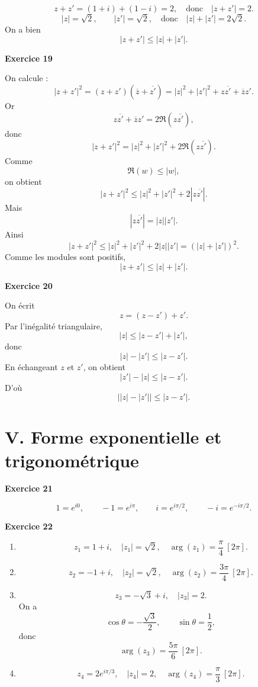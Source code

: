 \documentclass[11pt,a4paper]{article}
\begin{document}
\[
z+z'=(1+i)+(1-i)=2,
\quad \text{donc} \quad |z+z'|=2.
\]
\[
|z|=\sqrt2,\qquad |z'|=\sqrt2,
\quad \text{donc} \quad |z|+|z'|=2\sqrt2.
\]
On a bien
\[
|z+z'|\le |z|+|z'|.
\]

\textbf{Exercice 19}

On calcule :
\[
|z+z'|^2=(z+z')(\overline z+\overline{z'})
=|z|^2+|z'|^2+z\overline{z'}+\overline z z'.
\]
Or
\[
z\overline{z'}+\overline z z'=2\Re(z\overline{z'}),
\]
donc
\[
|z+z'|^2=|z|^2+|z'|^2+2\Re(z\overline{z'}).
\]
Comme
\[
\Re(w)\le |w|,
\]
on obtient
\[
|z+z'|^2\le |z|^2+|z'|^2+2|z\overline{z'}|.
\]
Mais
\[
|z\overline{z'}|=|z||z'|.
\]
Ainsi
\[
|z+z'|^2\le |z|^2+|z'|^2+2|z||z'|=(|z|+|z'|)^2.
\]
Comme les modules sont positifs,
\[
|z+z'|\le |z|+|z'|.
\]

\textbf{Exercice 20}

On écrit
\[
z=(z-z')+z'.
\]
Par l’inégalité triangulaire,
\[
|z|\le |z-z'|+|z'|,
\]
donc
\[
|z|-|z'|\le |z-z'|.
\]
En échangeant \(z\) et \(z'\), on obtient
\[
|z'|-|z|\le |z-z'|.
\]
D’où
\[
\big||z|-|z'|\big|\le |z-z'|.
\]

\section*{V. Forme exponentielle et trigonométrique}

\textbf{Exercice 21}

\[
1=e^{i0},
\qquad
-1=e^{i\pi},
\qquad
i=e^{i\pi/2},
\qquad
-i=e^{-i\pi/2}.
\]

\textbf{Exercice 22}

\begin{enumerate}[label=\alph*)]
    \item
    \[
    z_1=1+i,\quad |z_1|=\sqrt2,\quad \arg(z_1)=\frac{\pi}{4}\ [2\pi].
    \]

    \item
    \[
    z_2=-1+i,\quad |z_2|=\sqrt2,\quad \arg(z_2)=\frac{3\pi}{4}\ [2\pi].
    \]

    \item
    \[
    z_3=-\sqrt3+i,\quad |z_3|=2.
    \]
    On a
    \[
    \cos\theta=-\frac{\sqrt3}{2},\qquad \sin\theta=\frac12,
    \]
    donc
    \[
    \arg(z_3)=\frac{5\pi}{6}\ [2\pi].
    \]

    \item
    \[
    z_4=2e^{i\pi/3},\quad |z_4|=2,\quad \arg(z_4)=\frac{\pi}{3}\ [2\pi].
    \]
\end{enumerate}
\end{document}
